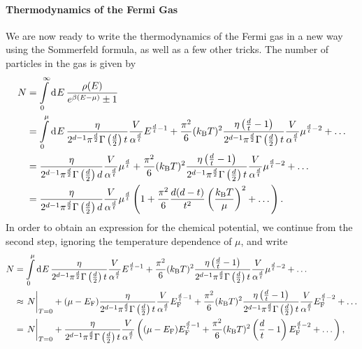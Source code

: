 \paragraph{Thermodynamics of the Fermi Gas}
We are now ready to write the thermodynamics of the Fermi gas in a new way using the Sommerfeld formula, as well as a few other tricks. The number of particles in the gas is given by
\begin{align*}
	N &= \int\limits_{0}^{\infty}\dd[]{E}\frac{\rho(E)}{e^{\beta(E - \mu)} \pm 1} \\
	  &= \int\limits_{0}^{\mu}\dd[]{E}\frac{\eta}{2^{d - 1}\pi^{\frac{d}{2}}\Gamma\left(\frac{d}{2}\right)t}\frac{V}{\alpha^{\frac{d}{t}}}E^{\frac{d}{t} - 1} +  \frac{\pi^{2}}{6}(k_{\text{B}} T)^{2}\frac{\eta\left(\frac{d}{t} - 1\right)}{2^{d - 1}\pi^{\frac{d}{2}}\Gamma\left(\frac{d}{2}\right)t}\frac{V}{\alpha^{\frac{d}{t}}}\mu^{\frac{d}{t} - 2} + \dots \\
	  &= \frac{\eta}{2^{d - 1}\pi^{\frac{d}{2}}\Gamma\left(\frac{d}{2}\right)d}\frac{V}{\alpha^{\frac{d}{t}}}\mu^{\frac{d}{t}} +  \frac{\pi^{2}}{6}(k_{\text{B}} T)^{2}\frac{\eta\left(\frac{d}{t} - 1\right)}{2^{d - 1}\pi^{\frac{d}{2}}\Gamma\left(\frac{d}{2}\right)t}\frac{V}{\alpha^{\frac{d}{t}}}\mu^{\frac{d}{t} - 2} + \dots \\
	  &= \frac{\eta}{2^{d - 1}\pi^{\frac{d}{2}}\Gamma\left(\frac{d}{2}\right)d}\frac{V}{\alpha^{\frac{d}{t}}}\mu^{\frac{d}{t}}\left(1 + \frac{\pi^{2}}{6}\frac{d(d - t)}{t^{2}}\left(\frac{k_{\text{B}} T}{\mu}\right)^{2} + \dots\right).
\end{align*}
In order to obtain an expression for the chemical potential, we continue from the second step, ignoring the temperature dependence of $\mu$, and write
\begin{align*}
	N &= \integ{0}{\mu}{E}{\frac{\eta}{2^{d - 1}\pi^{\frac{d}{2}}\gf{\frac{d}{2}}t}\frac{V}{\alpha^{\frac{d}{t}}}E^{\frac{d}{t} - 1}} +  \frac{\pi^{2}}{6}(\kb T)^{2}\frac{\eta\left(\frac{d}{t} - 1\right)}{2^{d - 1}\pi^{\frac{d}{2}}\gf{\frac{d}{2}}t}\frac{V}{\alpha^{\frac{d}{t}}}\mu^{\frac{d}{t} - 2} + \dots \\
      &\approx \eval{N}_{T = 0} + (\mu - E_{\text{F}})\frac{\eta}{2^{d - 1}\pi^{\frac{d}{2}}\gf{\frac{d}{2}}t}\frac{V}{\alpha^{\frac{d}{t}}}E_{\text{F}}^{\frac{d}{t} - 1} +  \frac{\pi^{2}}{6}(\kb T)^{2}\frac{\eta\left(\frac{d}{t} - 1\right)}{2^{d - 1}\pi^{\frac{d}{2}}\gf{\frac{d}{2}}t}\frac{V}{\alpha^{\frac{d}{t}}}E_{\text{F}}^{\frac{d}{t} - 2} + \dots \\
      &= \eval{N}_{T = 0} + \frac{\eta}{2^{d - 1}\pi^{\frac{d}{2}}\gf{\frac{d}{2}}t}\frac{V}{\alpha^{\frac{d}{t}}}\left((\mu - E_{\text{F}})E_{\text{F}}^{\frac{d}{t} - 1} +  \frac{\pi^{2}}{6}(\kb T)^{2}\left(\frac{d}{t} - 1\right)E_{\text{F}}^{\frac{d}{t} - 2} + \dots\right),
\end{align*}
